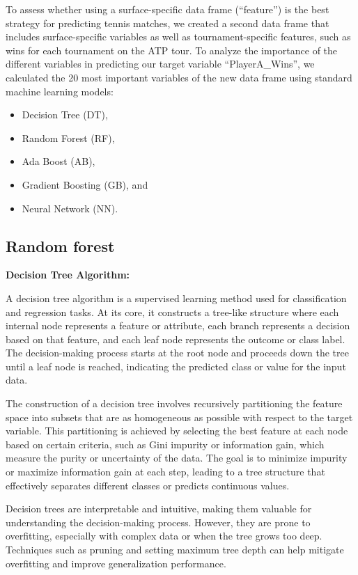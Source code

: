 \documentclass[preprint,aps,nofootinbib,a4paper,superscriptaddress,longbibliography,amsfonts,amssymb,amsmath,titlepage]{revtex4-2}
\begin{document}
To assess whether using a surface-specific data frame (``feature'') is the best strategy for predicting tennis matches, we created a second data frame that includes surface-specific variables as well as tournament-specific features, such as wins for each tournament on the ATP tour. To analyze the importance of the different variables in predicting our target variable ``PlayerA\_Wins'', we calculated the 20 most important variables of the new data frame using standard machine learning models:
%
\begin{itemize}
\item Decision Tree (DT),
\item Random Forest (RF),
\item Ada Boost (AB),
\item Gradient Boosting (GB), and
\item Neural Network (NN).
\end{itemize}

\subsection{Random forest}

\textbf{Decision Tree Algorithm:}

A decision tree algorithm is a supervised learning method used for classification and regression tasks. At its core, it constructs a tree-like structure where each internal node represents a feature or attribute, each branch represents a decision based on that feature, and each leaf node represents the outcome or class label. The decision-making process starts at the root node and proceeds down the tree until a leaf node is reached, indicating the predicted class or value for the input data.

The construction of a decision tree involves recursively partitioning the feature space into subsets that are as homogeneous as possible with respect to the target variable. This partitioning is achieved by selecting the best feature at each node based on certain criteria, such as Gini impurity or information gain, which measure the purity or uncertainty of the data. The goal is to minimize impurity or maximize information gain at each step, leading to a tree structure that effectively separates different classes or predicts continuous values.

Decision trees are interpretable and intuitive, making them valuable for understanding the decision-making process. However, they are prone to overfitting, especially with complex data or when the tree grows too deep. Techniques such as pruning and setting maximum tree depth can help mitigate overfitting and improve generalization performance.
\end{document}

